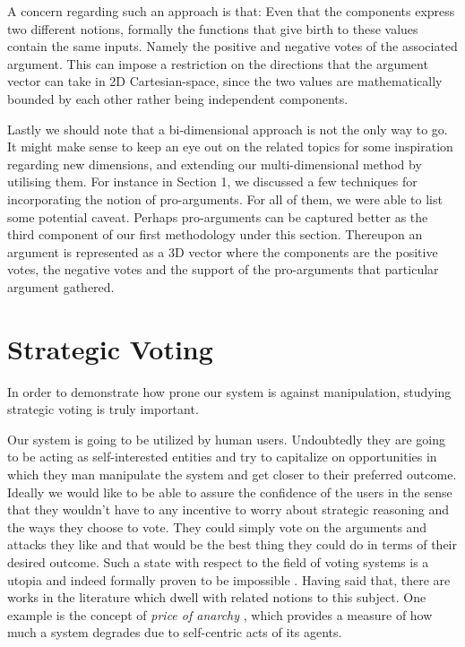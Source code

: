 \documentclass{article}
\begin{document}
A concern regarding such an approach is that: Even that the components express two different notions, formally the functions that give birth to these values contain the same inputs. Namely the positive and negative votes of the associated argument. This can impose a restriction on the directions that the argument vector can take in 2D Cartesian-space, since the two values are mathematically bounded by each other rather being independent components.

Lastly we should note that a bi-dimensional approach is not the only way to go. It might make sense to keep an eye out on the related topics for some inspiration regarding new dimensions, and extending our multi-dimensional method by utilising them. For instance in Section 1, we discussed a few techniques for incorporating the notion of pro-arguments. For all of them, we were able to list some potential caveat. Perhaps pro-arguments can be captured better as the third component of our first methodology under this section. Thereupon an argument is represented as a 3D vector where the components are the positive votes, the negative votes and the support of the pro-arguments that particular argument gathered. 
 
\section{Strategic Voting}
In order to demonstrate how prone our system is against manipulation, studying strategic voting is truly important.

Our system is going to be utilized by human users. Undoubtedly they are going to be acting as self-interested entities and try to capitalize on opportunities in which they man manipulate the system and get closer to their preferred outcome. Ideally we would like to be able to assure the confidence of the users in the sense that they wouldn't have to any incentive to worry about strategic reasoning and the ways they choose to vote. They could simply vote on the arguments and attacks they like and that would be the best thing they could do in terms of their desired outcome. Such a state with respect to the field of voting systems is a utopia and indeed formally proven to be impossible \cite{arrow}. Having said that, there are works in the literature which dwell with related notions to this subject. One example is the concept of \textit{price of anarchy}  \cite{koutsoupiasP99}, which provides a measure of how much a system degrades due to self-centric acts of its agents.
\end{document}

